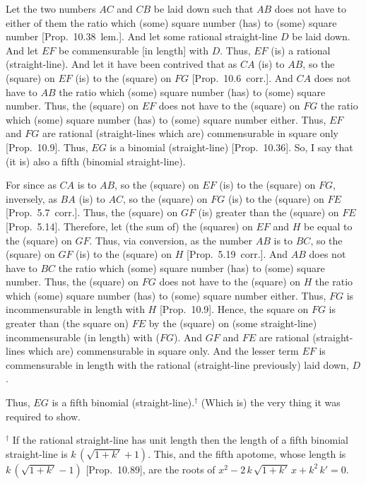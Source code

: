 \begin{Parallel}{}{}
{\epsfysize=1.3in
\centerline{}

Let the two numbers $AC$ and $CB$ be laid down such that $AB$ does
not have to either of them the ratio which (some) square number (has)
to (some) square number [Prop.~10.38~lem.]. And
let some rational straight-line $D$ be laid down. And let $EF$ be
commensurable [in length] with $D$. Thus, $EF$ (is) a rational (straight-line).
And let it have been contrived that as $CA$ (is) to $AB$, so the (square) on
$EF$ (is) to the (square) on $FG$ [Prop.~10.6~corr.].
 And $CA$ does not have to $AB$ the ratio which (some)
 square number (has) to (some) square number. Thus, the (square) on
 $EF$ does not have to the (square) on $FG$ the ratio which (some)
 square number (has) to (some) square number either. Thus, $EF$ and
 $FG$ are rational (straight-lines which are) commensurable in square only
 [Prop.~10.9].  Thus, $EG$ is a binomial (straight-line) [Prop.~10.36]. So, I say that (it is) also
 a fifth (binomial straight-line).
 
 For since as $CA$ is to $AB$, so the (square) on $EF$ (is) to the (square)
 on $FG$, inversely, as $BA$ (is) to $AC$, so the (square) on $FG$ (is)
 to the (square) on $FE$ [Prop.~5.7~corr.]. Thus,
 the (square) on $GF$ (is) greater than the (square) on $FE$ [Prop.~5.14]. Therefore, let (the sum of) the (squares)
 on $EF$ and $H$ be equal to the (square) on $GF$. Thus, via conversion, 
 as the number $AB$ is to $BC$, so the (square) on $GF$ (is) to
 the (square) on $H$ [Prop.~5.19~corr.]. 
 And $AB$ does not have to $BC$ the ratio which (some) square number
 (has) to (some) square number. Thus, the (square) on $FG$ does not have
 to the (square) on $H$ the ratio which (some) square number (has) to
 (some) square number either. Thus, $FG$ is incommensurable in length
 with $H$ [Prop.~10.9]. Hence, the square on $FG$
 is greater than (the square on) $FE$ by the (square) on (some straight-line)
 incommensurable (in length) with ($FG$). And $GF$ and $FE$ are rational (straight-lines
 which are) commensurable in square only. And the lesser term $EF$ is commensurable in length with the  rational (straight-line previously)  laid down, $D$.
 
 Thus, $EG$ is a fifth binomial (straight-line).$^\dag$  (Which is) the very thing it
 was required to show.}
\end{Parallel}
{\footnotesize\noindent $^\dag$ If the rational straight-line has unit length then the length of a fifth binomial straight-line
is  $k\,(\sqrt{1+k'}+1)$. This, and the fifth apotome,
whose length is $k\,(\sqrt{1+k'}-1)$ [Prop.~10.89],
are the roots of $x^2- 2\,k\,\sqrt{1+k'}\,x+k^2\,k'=0$.}
 
